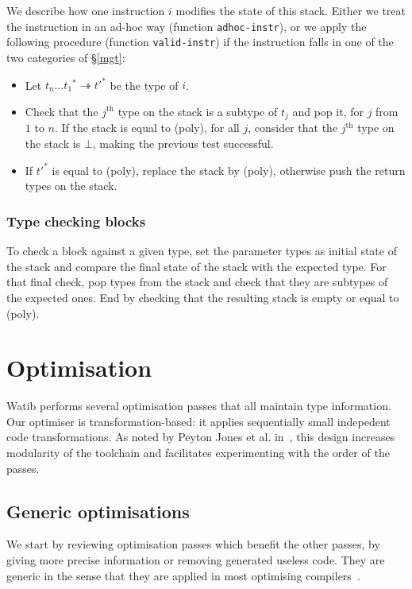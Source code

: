 \documentclass[a4paper,11pt]{article}
\begin{document}
We describe how one instruction $i$ modifies the state of this stack. Either we
treat the instruction in an ad-hoc way (function \texttt{adhoc-instr}), or we
apply the following procedure (function \texttt{valid-instr}) if the instruction
falls in one of the two categories of \S\ref{mgt}:
\begin{itemize}\setlength{\itemsep}{0pt}
\item Let ${t_n\ldots t_1}^*\twoheadrightarrow{t'}^*$ be the type of $i$.
\item Check that the $j^{\text{th}}$ type on the stack is a subtype of $t_j$ and
  pop it, for $j$ from $1$ to $n$. If the stack is equal to \textsf{(poly)}, for
  all $j$, consider that the $j^{\text{th}}$ type on the stack is $\bot$, making
  the previous test successful.
\item If ${t'}^*$ is equal to \textsf{(poly)}, replace the stack by
  \textsf{(poly)}, otherwise push the return types on the stack.
\end{itemize}

\subsubsection{Type checking blocks}
To check a block against a given type, set the parameter types as initial state
of the stack and compare the final state of the stack with the expected
type. For that final check, pop types from the stack and check that they
are subtypes of the expected ones. End by checking that the resulting stack is
empty or equal to \textsf{(poly)}.

\section{Optimisation}\label{opt}
\textsf{Watib} performs several optimisation passes that all maintain type
information. Our optimiser is transformation-based: it applies sequentially
small indepedent code transformations. As noted by Peyton Jones et al.
in~\cite{jones1998transformation}, this design increases modularity of the
toolchain and facilitates experimenting with the order of the passes.


\subsection{Generic optimisations}
We start by reviewing optimisation passes which benefit the other passes, by
giving more precise information or removing generated useless code. They are
generic in the sense that they are applied in most optimising
compilers~\cite{muchnick1997advanced}.
\end{document}

